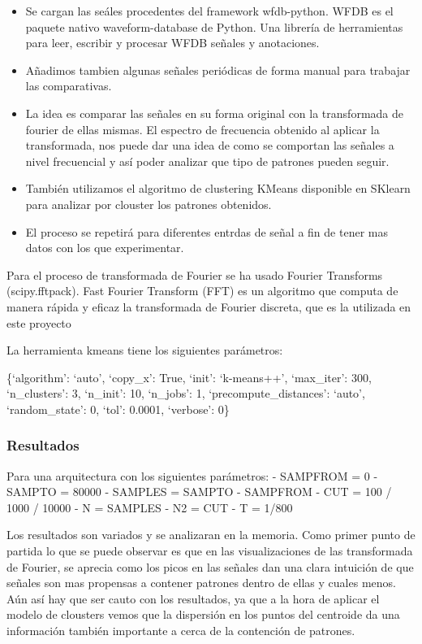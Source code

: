\documentclass[11pt]{article}
\providecommand{\tightlist}{%
      \setlength{\itemsep}{0pt}\setlength{\parskip}{0pt}}
\begin{document}
\begin{itemize}
\tightlist
\item
  Se cargan las seáles procedentes del framework wfdb-python. WFDB es el
  paquete nativo waveform-database de Python. Una librería de
  herramientas para leer, escribir y procesar WFDB señales y
  anotaciones.
\item
  Añadimos tambien algunas señales periódicas de forma manual para
  trabajar las comparativas.
\item
  La idea es comparar las señales en su forma original con la
  transformada de fourier de ellas mismas. El espectro de frecuencia
  obtenido al aplicar la transformada, nos puede dar una idea de como se
  comportan las señales a nivel frecuencial y así poder analizar que
  tipo de patrones pueden seguir.
\item
  También utilizamos el algoritmo de clustering KMeans disponible en
  SKlearn para analizar por clouster los patrones obtenidos.
\item
  El proceso se repetirá para diferentes entrdas de señal a fin de tener
  mas datos con los que experimentar.
\end{itemize}

Para el proceso de transformada de Fourier se ha usado Fourier
Transforms (scipy.fftpack). Fast Fourier Transform (FFT) es un algoritmo
que computa de manera rápida y eficaz la transformada de Fourier
discreta, que es la utilizada en este proyecto

La herramienta kmeans tiene los siguientes parámetros:

\{`algorithm': `auto', `copy\_x': True, `init': `k-means++',
`max\_iter': 300, `n\_clusters': 3, `n\_init': 10, `n\_jobs': 1,
`precompute\_distances': `auto', `random\_state': 0, `tol': 0.0001,
`verbose': 0\}

\hypertarget{resultados}{%
\subsubsection{Resultados}\label{resultados}}

Para una arquitectura con los siguientes parámetros: - SAMPFROM = 0 -
SAMPTO = 80000 - SAMPLES = SAMPTO - SAMPFROM - CUT = 100 / 1000 / 10000
- N = SAMPLES - N2 = CUT - T = 1/800

Los resultados son variados y se analizaran en la memoria. Como primer
punto de partida lo que se puede observar es que en las visualizaciones
de las transformada de Fourier, se aprecia como los picos en las señales
dan una clara intuición de que señales son mas propensas a contener
patrones dentro de ellas y cuales menos. Aún así hay que ser cauto con
los resultados, ya que a la hora de aplicar el modelo de clousters vemos
que la dispersión en los puntos del centroide da una información también
importante a cerca de la contención de patrones.
\end{document}
